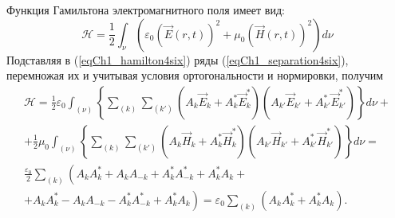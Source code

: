 Функция Гамильтона электромагнитного поля имеет вид:
\begin{equation}
\mathcal{H} = \frac{1}{2}
\int_{\nu}\left( \varepsilon_0\left(\vec{E}\left(r,t\right)\right)^2 + \mu_0
\left(\vec{H}\left(r,t\right)\right)^2\right) d\nu
\label{eqCh1_hamilton4six}
\end{equation}
Подставляя в (\ref{eqCh1_hamilton4six}) ряды
(\ref{eqCh1_separation4six}), перемножая их и учитывая условия
ортогональности и нормировки, получим 
\begin{eqnarray}
\mathcal{H} = \frac{1}{2} \varepsilon_0
\int_{(\nu)}\left\{
\sum_{(k)}\sum_{(k')}
\left(A_k\vec{E}_k + A_k^{*}\vec{E}_k^{*}\right)
\left(A_{k'}\vec{E}_{k'} + A_{k'}^{*}\vec{E}_{k'}^{*}\right)
\right\}d \nu +
\nonumber \\
+ 
\frac{1}{2} \mu_0
\int_{(\nu)}\left\{
\sum_{(k)}\sum_{(k')}
\left(A_k\vec{H}_k + A_k^{*}\vec{H}_k^{*}\right)
\left(A_{k'}\vec{H}_{k'} + A_{k'}^{*}\vec{H}_{k'}^{*}\right)
\right\} d \nu = 
\nonumber \\
\frac{\varepsilon_0}{2} \sum_{(k)} 
\left(
A_k A_k^{*} + A_k A_{-k} + A_k^{*} A_{-k}^{*} + A_k^{*} A_k +
\right.
\nonumber \\
\left.
+ A_k A_k^{*} - A_k A_{-k} - A_k^{*} A_{-k}^{*} + A_k^{*} A_k
\right) = \varepsilon_0 \sum_{(k)} 
\left(A_k A_k^{*} + A_k^{*} A_k \right).
\label{eqCh1_separation4hamilton}
\end{eqnarray}
